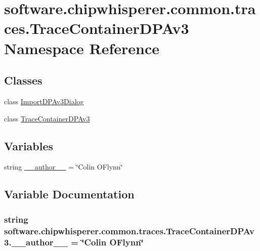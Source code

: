 \hypertarget{namespacesoftware_1_1chipwhisperer_1_1common_1_1traces_1_1TraceContainerDPAv3}{}\section{software.\+chipwhisperer.\+common.\+traces.\+Trace\+Container\+D\+P\+Av3 Namespace Reference}
\label{namespacesoftware_1_1chipwhisperer_1_1common_1_1traces_1_1TraceContainerDPAv3}
\subsection*{Classes}
\begin{DoxyCompactItemize}
\item 
class \hyperlink{classsoftware_1_1chipwhisperer_1_1common_1_1traces_1_1TraceContainerDPAv3_1_1ImportDPAv3Dialog}{Import\+D\+P\+Av3\+Dialog}
\item 
class \hyperlink{classsoftware_1_1chipwhisperer_1_1common_1_1traces_1_1TraceContainerDPAv3_1_1TraceContainerDPAv3}{Trace\+Container\+D\+P\+Av3}
\end{DoxyCompactItemize}
\subsection*{Variables}
\begin{DoxyCompactItemize}
\item 
string \hyperlink{namespacesoftware_1_1chipwhisperer_1_1common_1_1traces_1_1TraceContainerDPAv3_a4b6656928004a9e2b2cecad61cbb78dd}{\+\_\+\+\_\+author\+\_\+\+\_\+} = \char`\"{}Colin O\textquotesingle{}Flynn\char`\"{}
\end{DoxyCompactItemize}


\subsection{Variable Documentation}
\hypertarget{namespacesoftware_1_1chipwhisperer_1_1common_1_1traces_1_1TraceContainerDPAv3_a4b6656928004a9e2b2cecad61cbb78dd}{}
\subsubsection[{\+\_\+\+\_\+author\+\_\+\+\_\+}]{\setlength{\rightskip}{0pt plus 5cm}string software.\+chipwhisperer.\+common.\+traces.\+Trace\+Container\+D\+P\+Av3.\+\_\+\+\_\+author\+\_\+\+\_\+ = \char`\"{}Colin O\textquotesingle{}Flynn\char`\"{}}\label{namespacesoftware_1_1chipwhisperer_1_1common_1_1traces_1_1TraceContainerDPAv3_a4b6656928004a9e2b2cecad61cbb78dd}
